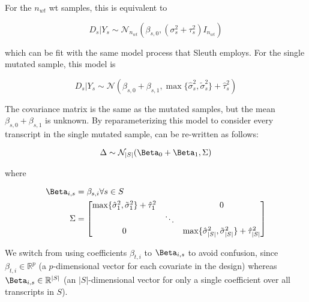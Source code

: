 For the $n_{wt}$ \gls{wt} samples, this is equivalent to

\begin{equation*}
  D_s | Y_s \sim \mathcal{N}_{n_{wt}} \left( \beta_{s,0}, (\sigma_s^2 + \tau_s^2)I_{n_{wt}} \right)
\end{equation*}

which can be fit with the same model process that Sleuth employs.
For the single mutated sample, this model is

\begin{equation}
  D_s | Y_s \sim \mathcal{N} \left( \beta_{s, 0} + \beta_{s, 1}, \max\{ \hat{\sigma}_s^2, \tilde{\sigma}_s^2 \} + \hat{\tau}_s^2 \right)
  \label{eqn:single_mut_model}
\end{equation}

The covariance matrix is the same as the mutated samples, but the mean $\beta_{s, 0} + \beta_{s, 1}$ is unknown.
By reparameterizing this model to consider every transcript in the single mutated sample,  can be re-written as follows:

\begin{equation}
  \Delta \sim \mathcal{N}_{|S|}(\Beta_0 + \Beta_1, \Sigma) \\
\end{equation}

where

\begin{align*}
  \Beta_{i,s} & = \beta_{s,i} \forall s \in S \\
  \Sigma      & = \begin{bmatrix}
    \max\{ \hat{\sigma}_1^2, \tilde{\sigma}_1^2 \} + \hat{\tau}_1^2 &        & 0                                                                           \\
                                                                    & \ddots &                                                                             \\
    0                                                               &        & \max\{ \hat{\sigma}_{|S|}^2, \tilde{\sigma}_{|S|}^2 \} + \hat{\tau}_{|S|}^2 \\
  \end{bmatrix}
\end{align*}

We switch from using coefficients $\beta_{t,i}$ to $\Beta_{i,s}$ to avoid confusion, since $\beta_{t,i} \in \mathbb{R}^p$ (a $p$-dimensional vector for each covariate in the design) whereas $\Beta_{i,s} \in \mathbb{R}^{|S|}$ (an $|S|$-dimensional vector for only a single coefficient over all transcripts in $S$).

